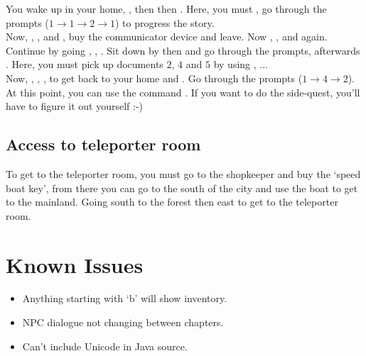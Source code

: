 \documentclass{article}
\begin{document}
\begin{multicols}{2}
            You wake up in your home, , then  then . Here, you must , go through the prompts ($1 \rightarrow 1 \rightarrow 2 \rightarrow 1$) to progress the story. \\

            Now, , ,  and , buy the communicator device and leave. Now , ,  and  again. Continue by going , , . Sit down by  then  and go through the prompts, afterwards . Here, you must pick up documents $2$, $4$ and $5$ by using , ... \\

            Now, , , ,  to get back to your home and . Go through the prompts ($1 \rightarrow 4 \rightarrow 2$). At this point, you can use the command . If you want to do the side-quest, you'll have to figure it out yourself :-)

            \subsection{Access to teleporter room}
            To get to the teleporter room, you must go to the shopkeeper and buy the `speed boat key', from there you can go to the south of the city and use the boat to get to the mainland. Going south to the forest then east to get to the teleporter room.

        \section{Known Issues}
        
            \begin{itemize}[leftmargin=*]
                \item Anything starting with `b' will show inventory.
                \item NPC dialogue not changing between chapters.
                \item Can't include Unicode in Java source.
            \end{itemize}

    \end{multicols}

    \newpage
\end{document}
